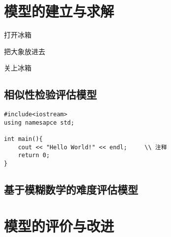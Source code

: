\section{模型的建立与求解}

\begin{mgAlgorithm}
    \item 打开冰箱
    \item 把大象放进去
    \item 关上冰箱
\end{mgAlgorithm}

\subsection{相似性检验评估模型}


\begin{mgCodeBlock}
\end{mgCodeBlock}

\begin{mgCodeBlock}
\begin{verbatim}
#include<iostream>
using namesapce std;

int main(){
    cout << "Hello World!" << endl;     \\ 注释
    return 0;
}
\end{verbatim}
\end{mgCodeBlock}

\subsection{基于模糊数学的难度评估模型}

\subsection{}

\section{模型的评价与改进}
